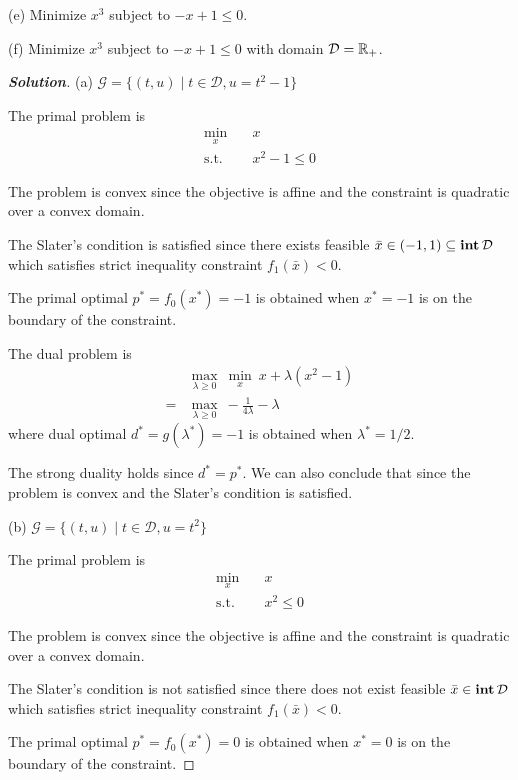 \documentclass[11pt]{article}
\newenvironment{solution}
  {\renewcommand\qedsymbol{$\square$}\begin{proof}[\textbf{Solution}]}
  {\end{proof}}
\begin{document}
(e) Minimize $x^3$ subject to $-x + 1 \leq 0$.

(f) Minimize $x^3$ subject to $-x + 1 \leq 0$ with domain $\mathcal{D} = {{\mathbb{R}}}_+$.

\begin{solution}
(a) $\mathcal{G} = \{(t, u) \mid t\in\mathcal{D}, u = t^2-1\}$

The primal problem is
\begin{align*}
  \min_x \quad & x\\
  \text{s.t.} \quad & x^2 - 1 \leq 0
\end{align*}

The problem is convex since the objective is affine and the constraint is quadratic over a convex domain.

The Slater's condition is satisfied since there exists feasible $\bar x\in(-1, 1) \subseteq \mathop{\textbf{int}} \mathcal{D}$ which satisfies strict inequality constraint $f_1(\bar x) <0 $.

The primal optimal $p^* = f_0(x^*) = -1$ is obtained when $x^* = -1$ is on the boundary of the constraint.

The dual problem is
\begin{align*}
  &\max_{\lambda\geq 0}\ \min_x \ x + \lambda(x^2 - 1)\\
  =& \max_{\lambda\geq 0}\ - \frac{1}{4\lambda} -\lambda 
\end{align*}
where dual optimal $d^* = g(\lambda^*) = -1$ is obtained when $\lambda^* = 1/2$.

The strong duality holds since $d^* = p^*$. We can also conclude that since the problem is convex and the Slater's condition is satisfied.


(b) $\mathcal{G} = \{(t, u) \mid t\in\mathcal{D}, u = t^2\}$

The primal problem is
\begin{align*}
  \min_x \quad & x\\
  \text{s.t.} \quad & x^2 \leq 0
\end{align*}

The problem is convex since the objective is affine and the constraint is quadratic over a convex domain.

The Slater's condition is not satisfied since there does not exist feasible $\bar x\in \mathop{\textbf{int}} \mathcal{D}$ which satisfies strict inequality constraint $f_1(\bar x) < 0 $.

The primal optimal $p^* = f_0(x^*) = 0$ is obtained when $x^* = 0$ is on the boundary of the constraint.


\end{solution}
\end{document}
